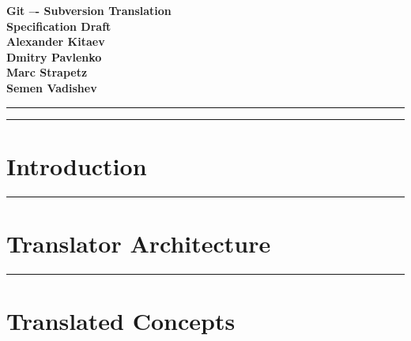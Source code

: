 \documentclass[aps,%
12pt,%
final,%
oneside,
onecolumn,%
superscriptaddress,%
centertags]{article} %
\begin{document}
\begin{titlepage}
\begin{center}

\textbf{\LARGE Git –- Subversion Translation} \\[2.0cm]
\textbf{\Large Specification Draft} \\[3.0cm]

\textbf{Alexander Kitaev} \\[0.7cm]
\textbf{Dmitry Pavlenko} \\[0.7cm]
\textbf{Marc Strapetz} \\[0.7cm]
\textbf{Semen Vadishev} \\[0.7cm]

\end{center}
\end{titlepage}

\topmargin=-10pt
\setcounter{page}{2}

\newpage
\hrule
\tableofcontents

\newpage
\hrule
\section{Introduction}


\newpage
\hrule
\section{Translator Architecture}






\newpage
\hrule
\section{Translated Concepts}







\end{document}

